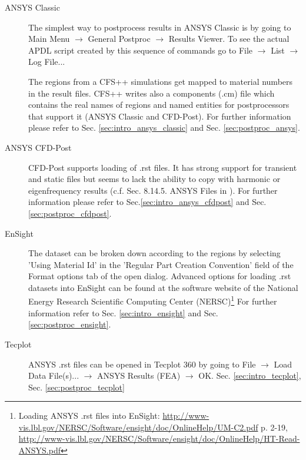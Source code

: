 \begin{description}

\item[ANSYS Classic] The simplest way  to postprocess results in ANSYS Classic
is by going to Main  Menu $\rightarrow$ General Postproc $\rightarrow$ Results
Viewer. To see the actual APDL  script created by this sequence of commands go
to File $\rightarrow$ List $\rightarrow$ Log File... 

The regions  from a CFS++  simulations get mapped  to material numbers  in the
result files.  CFS++ writes  also a components  (.cm) file which  contains the
real names  of regions and named  entities for postprocessors  that support it
(ANSYS Classic  and CFD-Post).  For further information  please refer  to Sec.
\ref{sec:intro_ansys_classic} and Sec. \ref{sec:postproc_ansys}.

\item[ANSYS CFD-Post] CFD-Post supports loading  of .rst files.  It has strong
support for transient  and static files but seems to lack  the ability to copy
with harmonic  or eigenfrequency  results (c.f. Sec.   8.14.5. ANSYS  Files in
\cite{ANSYSCFDPostUG2010}).   For   further   information  please   refer   to
Sec.\ref{sec:intro_ansys_cfdpost} and Sec. \ref{sec:postproc_cfdpost}.

\item[EnSight]  The dataset can  be broken  down according  to the  regions by
selecting 'Using Material Id' in  the 'Regular Part Creation Convention' field
of the  Format options tab  of the open  dialog. Advanced options  for loading
.rst  datasets into  EnSight  can be  found  at the  software  website of  the
National Energy Research  Scientific Computing Center (NERSC)\footnote{Loading
ANSYS             .rst             files             into             EnSight:
\url{http://www-vis.lbl.gov/NERSC/Software/ensight/doc/OnlineHelp/UM-C2.pdf}
p.                                                                        2-19,
\url{http://www-vis.lbl.gov/NERSC/Software/ensight/doc/OnlineHelp/HT-Read-ANSYS.pdf}}
For  further  information  refer  to Sec.   \ref{sec:intro_ensight}  and  Sec.
\ref{sec:postproc_ensight}.

\item[Tecplot] ANSYS .rst files can be  opened in Tecplot 360 by going to File
$\rightarrow$   Load  Data  File(s)...   $\rightarrow$  ANSYS   Results  (FEA)
$\rightarrow$           OK.            Sec.           \ref{sec:intro_tecplot},
Sec. \ref{sec:postproc_tecplot}


\end{description}
